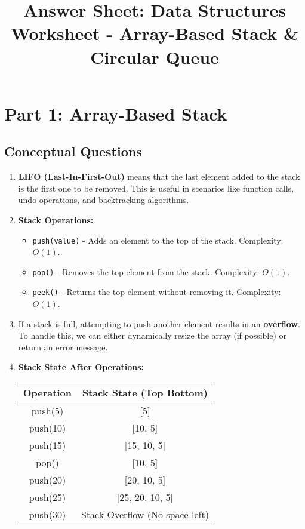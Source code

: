 \documentclass[12pt]{article}
\title{\textbf{Answer Sheet: Data Structures Worksheet - Array-Based Stack \& Circular Queue}}
\author{}
\date{}
\begin{document}
\maketitle

\section*{Part 1: Array-Based Stack}

\subsection*{Conceptual Questions}
\begin{enumerate}
    \item \textbf{LIFO (Last-In-First-Out)} means that the last element added to the stack is the first one to be removed. This is useful in scenarios like function calls, undo operations, and backtracking algorithms.
    
    \item \textbf{Stack Operations:}
    \begin{itemize}
        \item \texttt{push(value)} - Adds an element to the top of the stack. Complexity: $O(1)$.
        \item \texttt{pop()} - Removes the top element from the stack. Complexity: $O(1)$.
        \item \texttt{peek()} - Returns the top element without removing it. Complexity: $O(1)$.
    \end{itemize}
    
    \item If a stack is full, attempting to push another element results in an \textbf{overflow}. To handle this, we can either dynamically resize the array (if possible) or return an error message.
    
    \item \textbf{Stack State After Operations:}
    
    \begin{tabular}{|c|c|}
    \hline
    Operation & Stack State (Top \textrightarrow{} Bottom) \\
    \hline
    push(5) & [5] \\
    push(10) & [10, 5] \\
    push(15) & [15, 10, 5] \\
    pop() & [10, 5] \\
    push(20) & [20, 10, 5] \\
    push(25) & [25, 20, 10, 5] \\
    push(30) & Stack Overflow (No space left) \\
    \hline
    \end{tabular}
    

\end{enumerate}
\end{document}

